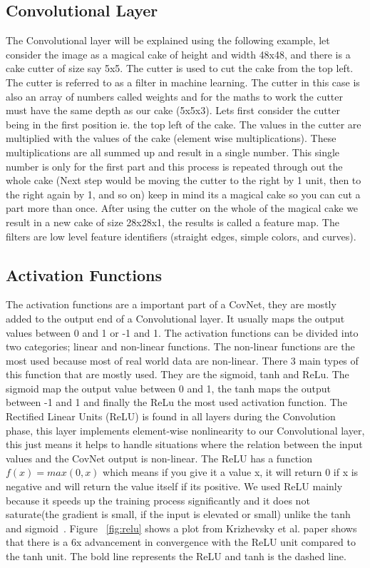 \documentclass[12pt, a4paper,oneside]{report}
\begin{document}
\subsection{Convolutional Layer}
The Convolutional layer will be explained using the following example, let consider the image as a magical cake of height and width 48x48, and there is a cake cutter of size say 5x5. The cutter is used to cut the cake from the top left. The cutter is referred to as a filter in machine learning. The cutter in this case is also an array of numbers called weights and for the maths to work the cutter must have the same depth as our cake (5x5x3).
Lets first consider the cutter being in the first position ie. the top left of the cake. The values in the cutter are multiplied with the values of the cake (element wise multiplications). These multiplications are all summed up and result in a single number. This single number is only for the first part and this process is repeated through out the whole cake (Next step would be moving the cutter to the right by 1 unit, then to the right again by 1, and so on) keep in mind its a magical cake so you can cut a part more than once. After using the cutter on the whole of the magical cake we result in a new cake of size 28x28x1, the results is called a feature map. The filters are low level feature identifiers (straight edges, simple colors, and curves). 


\subsection{Activation Functions}
The activation functions are a important part of a CovNet, they are mostly added to the output end of a Convolutional layer. It usually maps the output values between 0 and 1 or -1 and 1. The activation functions can be divided into two categories; linear and non-linear functions. The non-linear functions are the most used because most of real world data are non-linear. There 3 main types of this function that are mostly used. They are the sigmoid, tanh and ReLu. The sigmoid map the output value between 0 and 1, the tanh maps the output between -1 and 1 and finally the ReLu the most used activation function. The Rectified Linear Units (ReLU) is found in all layers during the Convolution phase, this layer implements element-wise nonlinearity to our Convolutional layer, this just means it helps to handle situations where the relation between the input values and the CovNet output is non-linear. The ReLU has a function \(f(x) = max(0,x)\) which means if you give it a value x, it will return 0 if x is negative and will return the value itself if its positive. We used ReLU mainly because it speeds up the training process significantly and it does not saturate(the gradient is small, if the input is elevated or small) unlike the tanh and sigmoid~\cite{relu}. Figure ~\ref{fig:relu} shows a plot from Krizhevsky et al. \cite{krizhevsky2012imagenet} paper shows that there is a 6x advancement in convergence with the ReLU unit compared to the tanh unit. The bold line represents the ReLU and tanh is the dashed line.
\end{document}

